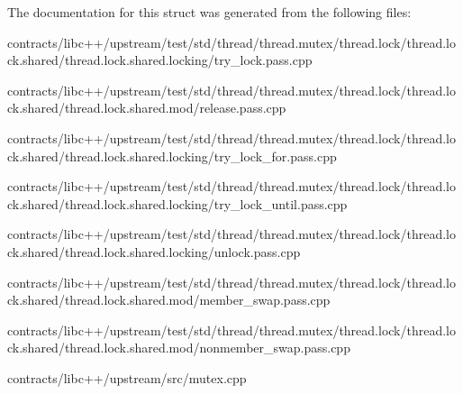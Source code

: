 The documentation for this struct was generated from the following files\+:\begin{DoxyCompactItemize}
\item 
contracts/libc++/upstream/test/std/thread/thread.\+mutex/thread.\+lock/thread.\+lock.\+shared/thread.\+lock.\+shared.\+locking/try\+\_\+lock.\+pass.\+cpp\item 
contracts/libc++/upstream/test/std/thread/thread.\+mutex/thread.\+lock/thread.\+lock.\+shared/thread.\+lock.\+shared.\+mod/release.\+pass.\+cpp\item 
contracts/libc++/upstream/test/std/thread/thread.\+mutex/thread.\+lock/thread.\+lock.\+shared/thread.\+lock.\+shared.\+locking/try\+\_\+lock\+\_\+for.\+pass.\+cpp\item 
contracts/libc++/upstream/test/std/thread/thread.\+mutex/thread.\+lock/thread.\+lock.\+shared/thread.\+lock.\+shared.\+locking/try\+\_\+lock\+\_\+until.\+pass.\+cpp\item 
contracts/libc++/upstream/test/std/thread/thread.\+mutex/thread.\+lock/thread.\+lock.\+shared/thread.\+lock.\+shared.\+locking/unlock.\+pass.\+cpp\item 
contracts/libc++/upstream/test/std/thread/thread.\+mutex/thread.\+lock/thread.\+lock.\+shared/thread.\+lock.\+shared.\+mod/member\+\_\+swap.\+pass.\+cpp\item 
contracts/libc++/upstream/test/std/thread/thread.\+mutex/thread.\+lock/thread.\+lock.\+shared/thread.\+lock.\+shared.\+mod/nonmember\+\_\+swap.\+pass.\+cpp\item 
contracts/libc++/upstream/src/mutex.\+cpp\end{DoxyCompactItemize}
